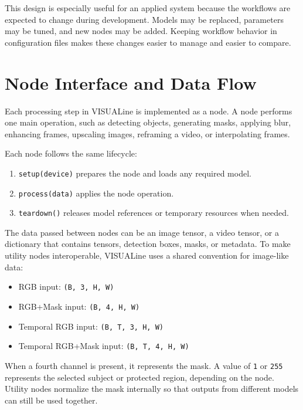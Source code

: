 \documentclass[11pt,a4paper]{article}
\begin{document}
This design is especially useful for an applied system because the workflows are expected to change during development. Models may be replaced, parameters may be tuned, and new nodes may be added. Keeping workflow behavior in configuration files makes these changes easier to manage and easier to compare.

\section{Node Interface and Data Flow}

Each processing step in VISUALine is implemented as a node. A node performs one main operation, such as detecting objects, generating masks, applying blur, enhancing frames, upscaling images, reframing a video, or interpolating frames.

Each node follows the same lifecycle:

\begin{enumerate}[leftmargin=*]
    \item \texttt{setup(device)} prepares the node and loads any required model.
    \item \texttt{process(data)} applies the node operation.
    \item \texttt{teardown()} releases model references or temporary resources when needed.
\end{enumerate}

The data passed between nodes can be an image tensor, a video tensor, or a dictionary that contains tensors, detection boxes, masks, or metadata. To make utility nodes interoperable, VISUALine uses a shared convention for image-like data:

\begin{itemize}[leftmargin=*]
    \item RGB input: \texttt{(B, 3, H, W)}
    \item RGB+Mask input: \texttt{(B, 4, H, W)}
    \item Temporal RGB input: \texttt{(B, T, 3, H, W)}
    \item Temporal RGB+Mask input: \texttt{(B, T, 4, H, W)}
\end{itemize}

When a fourth channel is present, it represents the mask. A value of \texttt{1} or \texttt{255} represents the selected subject or protected region, depending on the node. Utility nodes normalize the mask internally so that outputs from different models can still be used together.
\end{document}
